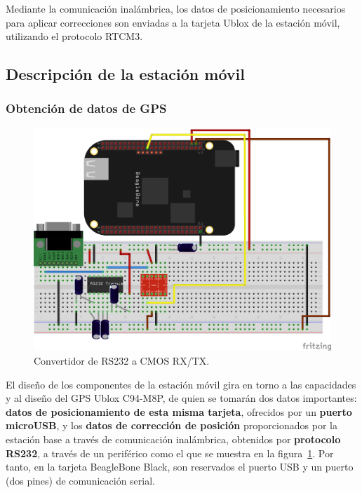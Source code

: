 Mediante la comunicación inalámbrica, los datos de posicionamiento necesarios para aplicar correcciones son enviadas a la tarjeta Ublox de la estación móvil, utilizando el protocolo RTCM3.

\subsection{Descripción de la estación móvil}

\subsubsection{Obtención de datos de GPS}

\begin{figure}[H]
\centering
\includegraphics[scale=0.75]{Figures/Max232}
\caption[Convertidor de RS232 a CMOS RX/TX.]{Convertidor de RS232 a CMOS RX/TX.\footnotemark}
\label{fig:convert}
\end{figure}


El diseño de los componentes de la estación móvil gira en torno a las capacidades y al diseño del GPS Ublox C94-M8P, de quien se tomarán dos datos importantes: \textbf{datos de posicionamiento de esta misma tarjeta}, ofrecidos por un \textbf{puerto microUSB}, y los \textbf{datos de corrección de posición} proporcionados por la estación base a través de comunicación inalámbrica, obtenidos por \textbf{protocolo RS232}, a través de un periférico como el que se muestra en la figura~\ref{fig:convert}. Por tanto, en la tarjeta BeagleBone Black, son reservados el puerto USB y un puerto (dos pines) de comunicación serial.\\

